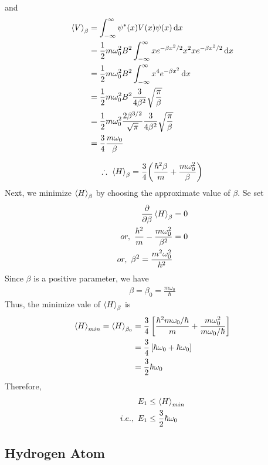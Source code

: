 	and
	\begin{align*}
		\expval{V}_\beta 
		&= \int_{-\infty}^{\infty} \psi^*\qty(x) V\qty(x) \psi\qty(x) \dd{x} \\
		&= \frac{1}{2} m \omega_0^2 B^2 \int_{-\infty}^{\infty} x e^{-\beta x^2/2} x^2 x e^{-\beta x^2/2} \dd{x}\\
		&= \frac{1}{2} m \omega_0^2 B^2 \int_{-\infty}^{\infty} x^4 e^{-\beta x^2} \dd{x} \\
		&= \frac{1}{2} m \omega_0^2 B^2 \frac{3}{4 \beta^2} \sqrt{\frac{\pi}{\beta}} \\
		&= \frac{1}{2} m \omega_0^2 \frac{2 \beta^{3/2}}{\sqrt{\pi}} \frac{3}{4 \beta^2} \sqrt{\frac{\pi}{\beta}} \\
		&= \frac{3}{4} \frac{m \omega_0}{\beta}
	\end{align*}
	
	\begin{align}
		\therefore\ \expval{H}_\beta = \frac{3}{4} \qty(\frac{\hbar^2 \beta}{m} + \frac{m\omega_0^2}{\beta}) 
	\end{align}
	Next, we minimize $\expval{H}_\beta$ by choosing the approximate value of $\beta$. Se set
	\begin{align*}
		\pdv{}{\beta} \expval{H}_\beta &= 0\\
		or,\ \frac{\hbar^2}{m} - \frac{m \omega_0^2}{\beta^2} &=0\\
		or,\ \beta^2 = \frac{m^2 \omega_0^2}{\hbar^2}
	\end{align*}
	Since $\beta$ is a positive parameter, we have
	\begin{align*}
		\beta = \beta_0 = \frac{m \omega_0}{\hbar}
	\end{align*}
	Thus, the minimize vale of $\expval{H}_\beta$ is
	\begin{align*}
		\expval{H}_{min} = \expval{H}_{\beta_0} 
		&= \frac{3}{4} \left[\frac{\hbar^2  m\omega_0/\hbar}{m}  +  \frac{m \omega_0^2}{m \omega_0/\hbar}\right]\\
		&= \frac{3}{4} \left[\hbar \omega_0 + \hbar \omega_0\right]\\
		&= \frac{3}{2} \hbar \omega_0
	\end{align*}
	Therefore,
	\begin{align*}
		E_1 &\leq \expval{H}_{min}\\
		i.e., \ E_1 &\leq \frac{3}{2} \hbar \omega_0
	\end{align*}
	
	
	
	\subsection{Hydrogen Atom}
